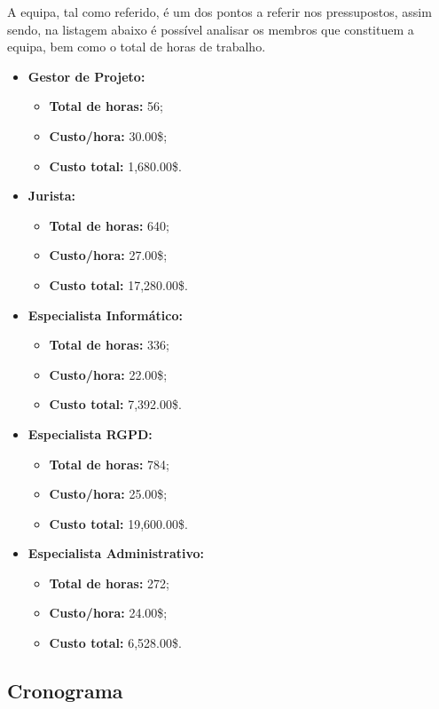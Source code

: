 A equipa, tal como referido, é um dos pontos a referir nos pressupostos, assim sendo, na listagem abaixo é possível analisar os membros que constituem a equipa, bem como o total de horas de trabalho.

\begin{itemize}
	\item \textbf{Gestor de Projeto:}
		\begin{itemize}
			\item \textbf{Total de horas:} 56;
			\item \textbf{Custo/hora:} 30.00\$;
			\item \textbf{Custo total:} 1,680.00\$.
		\end{itemize}
	\item \textbf{Jurista:}
		\begin{itemize}
			\item \textbf{Total de horas:} 640;
			\item \textbf{Custo/hora:} 27.00\$;
			\item \textbf{Custo total:} 17,280.00\$.
		\end{itemize}
	\item \textbf{Especialista Informático:}
		\begin{itemize}
			\item \textbf{Total de horas:} 336;
			\item \textbf{Custo/hora:} 22.00\$;
			\item \textbf{Custo total:} 7,392.00\$.
		\end{itemize}
	\item \textbf{Especialista RGPD:}
		\begin{itemize}
			\item \textbf{Total de horas:} 784;
			\item \textbf{Custo/hora:} 25.00\$;
			\item \textbf{Custo total:} 19,600.00\$.
		\end{itemize}
	\item \textbf{Especialista Administrativo:}
		\begin{itemize}
			\item \textbf{Total de horas:} 272;
			\item \textbf{Custo/hora:} 24.00\$;
			\item \textbf{Custo total:} 6,528.00\$.
		\end{itemize}
\end{itemize}

\subsection{Cronograma}

